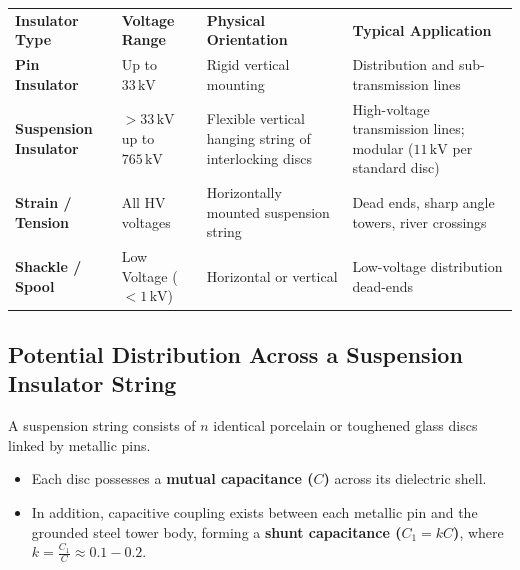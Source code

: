 \documentclass[11pt,a4paper]{article}
\begin{document}
\begin{center}
\small
\begin{tabularx}{\textwidth}{L{2.8cm} C{2.2cm} L{3.8cm} X}
  \color{white}\textbf{Insulator Type} & \color{white}\textbf{Voltage Range} & \color{white}\textbf{Physical Orientation} & \color{white}\textbf{Typical Application} \\
   \textbf{Pin Insulator} & Up to $33\,\text{kV}$ & Rigid vertical mounting & Distribution and sub-transmission lines \\
  \textbf{Suspension Insulator} & $> 33\,\text{kV}$ up to $765\,\text{kV}$ & Flexible vertical hanging string of interlocking discs & High-voltage transmission lines; modular ($11\,\text{kV}$ per standard disc) \\
   \textbf{Strain / Tension} & All HV voltages & Horizontally mounted suspension string & Dead ends, sharp angle towers, river crossings \\
  \textbf{Shackle / Spool} & Low Voltage ($<1\,\text{kV}$) & Horizontal or vertical & Low-voltage distribution dead-ends \\
\end{tabularx}
\end{center}

\subsection{Potential Distribution Across a Suspension Insulator String}

A suspension string consists of $n$ identical porcelain or toughened glass discs linked by metallic pins.
\begin{itemize}
  \item Each disc possesses a \textbf{mutual capacitance ($C$)} across its dielectric shell.
  \item In addition, capacitive coupling exists between each metallic pin and the grounded steel tower body, forming a \textbf{shunt capacitance ($C_1 = k C$)}, where $k = \frac{C_1}{C} \approx 0.1 - 0.2$.
\end{itemize}
\end{document}
